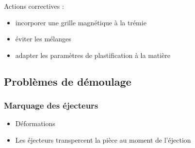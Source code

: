 \documentclass[11pt,oneside]{article}
\begin{document}
         Actions correctives : 
\begin{itemize}
 \item   incorporer une grille magnétique à la trémie 
 \item   éviter les mélanges 
 \item   adapter les paramètres de plastification à la matière 
\end{itemize}

         
%          
% 
%         
       \subsection{Problèmes de démoulage}
       \subsubsection{Marquage des éjecteurs}
\begin{itemize}
\item Déformations 
\item Les éjecteurs transpercent la pièce au moment de l'éjection 
\end{itemize}
\end{document}
